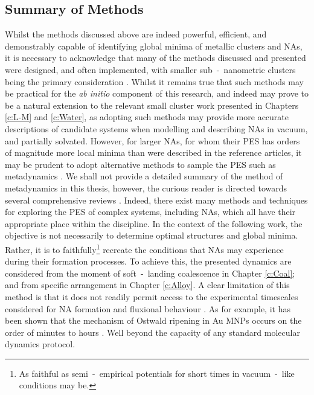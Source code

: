 \subsection{Summary of Methods}

Whilst the methods discussed above are indeed powerful, efficient, and demonstrably capable of identifying global minima of metallic clusters and NAs, it is necessary to acknowledge that many of the methods discussed and presented were designed, and often implemented, with smaller sub~-~nanometric clusters being the primary consideration \cite{C5CP01198A,doi:10.1021/acs.jctc.5b00962,doi:10.1080/00268970210162691,C7CP03346J}. Whilst it remains true that such methods may be practical for the \textit{ab initio} component of this research, and indeed may prove to be a natural extension to the relevant small cluster work presented in Chapters \ref{c:L-M} and \ref{c:Water}, as adopting such methods may provide more accurate descriptions of candidate systems when modelling and describing NAs in vacuum, and partially solvated. However, for larger NAs, for whom their PES has orders of magnitude more local minima than were described in the reference articles, it may be prudent to adopt alternative methods to sample the PES such as metadynamics \cite{10.1063/1.4935272}. We shall not provide a detailed summary of the method of metadynamics in this thesis, however, the curious reader is directed towards several comprehensive reviews \cite{https://doi.org/10.1002/wcms.31,doi:10.1146/annurev-physchem-040215-112229,Laio_2008}. Indeed, there exist many methods and techniques for exploring the PES of complex systems, including NAs, which all have their appropriate place within the discipline. In the context of the following work, the objective is not necessarily to determine optimal structures and global minima. Rather, it is to faithfully\footnote[3]{As faithful as semi~-~empirical potentials for short times in vacuum~-~like conditions may be.} recreate the conditions that NAs may experience during their formation processes. To achieve this, the presented dynamics are considered from the moment of soft~-~landing coalescence in Chapter \ref{c:Coal}; and from specific arrangement in Chapter \ref{c:Alloy}. A clear limitation of this method is that it does not readily permit access to the experimental timescales considered for NA formation and fluxional behaviour \cite{https://doi.org/10.1002/smll.201001138,https://doi.org/10.1002/smll.200801169}. As for example, it has been shown that the mechanism of Ostwald ripening in Au MNPs occurs on the order of minutes to hours \cite{doi:10.1021/acs.langmuir.6b02662}. Well beyond the capacity of any standard molecular dynamics protocol. 